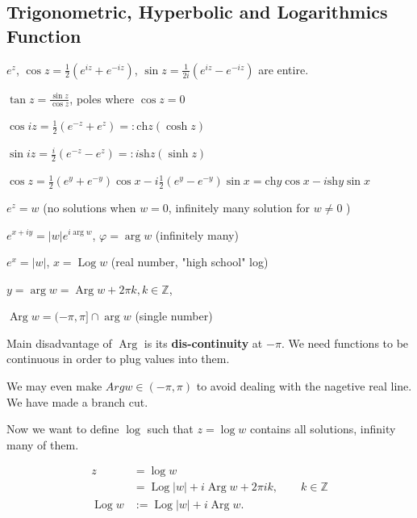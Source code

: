 \subsection{Trigonometric, Hyperbolic and Logarithmics Function}

$e^z$, $\cos z = \frac{1}{2}(e^{iz} + e^{-iz })$, $\sin z = \frac{1}{2i } \left( e^{iz }- e^{-iz } \right) $ are entire.

 $\tan z = \frac{\sin z}{\cos z}$, poles where $\cos z = 0$ 

\begin{example}
	$\cos iz = \frac{1}{2}(e^{-z} + e^z) =: \text{ch} z (\cosh z)$ 

	$\sin iz = \frac{i}{2}(e^{-z} - e^z) =:i \text{sh} z (\sinh z)$ 

	$\cos z = \frac{1}{2} (e^y + e^{-y}) \cos x - i \frac{1}{2} (e^y - e^{-y}) \sin x = \text{ch} y \cos x - i \text{sh} y \sin x$

\end{example}

$e^z = w$ (no solutions when $w = 0$, infinitely many solution for $w \neq  0$ )

$e^{x+iy } = |w| e^{i \operatorname{arg} w}$, $\varphi = \operatorname{arg}  w $ (infinitely many)

$e^x = |w|$, $x = \operatorname{Log} w$ (real number, "high school" log)

$y = \operatorname{arg} w = \operatorname{Arg} w + 2 \pi k, k \in \mathbb{Z}$, 

$\operatorname{Arg} w = (-\pi, \pi] \cap  \operatorname{arg} w$ (single number)

\begin{remark}
	 Main disadvantage of $\operatorname{Arg}$ is its \textbf{dis-continuity} at $-\pi$. We need functions to be continuous in order to plug values into them.

	 We may even make $Arg w \in (-\pi, \pi)$ to avoid dealing with the nagetive real line. We have made a branch cut.
\end{remark}

Now we want to define $\log$ such that $z = \log w$ contains all solutions, infinity many of them.

\begin{align*}
	z &= \log w \\
	&= \operatorname{Log} |w| + i \operatorname{Arg} w + 2 \pi i k,\qquad k \in \mathbb{Z}\\
	\operatorname{Log} w &:= \operatorname{Log} |w| + i \operatorname{Arg}  w
.\end{align*}

